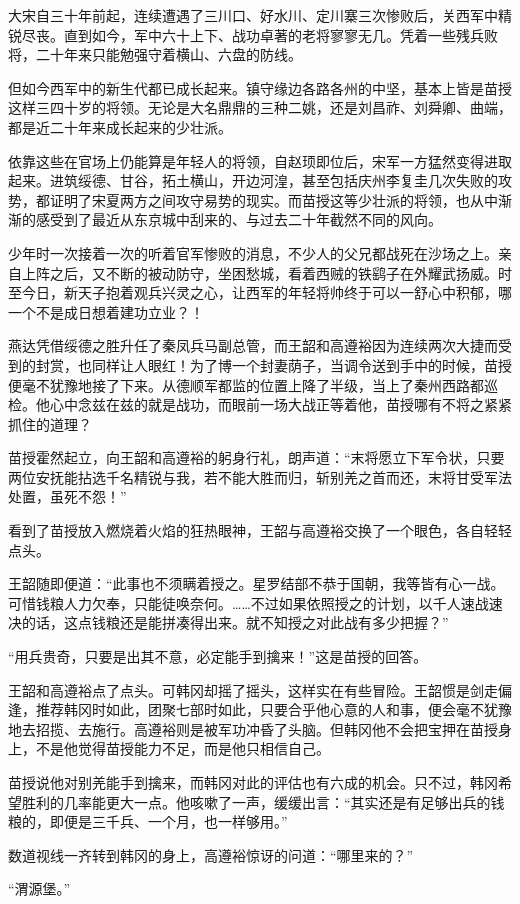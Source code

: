 大宋自三十年前起，连续遭遇了三川口、好水川、定川寨三次惨败后，关西军中精锐尽丧。直到如今，军中六十上下、战功卓著的老将寥寥无几。凭着一些残兵败将，二十年来只能勉强守着横山、六盘的防线。

但如今西军中的新生代都已成长起来。镇守缘边各路各州的中坚，基本上皆是苗授这样三四十岁的将领。无论是大名鼎鼎的三种二姚，还是刘昌祚、刘舜卿、曲端，都是近二十年来成长起来的少壮派。

依靠这些在官场上仍能算是年轻人的将领，自赵顼即位后，宋军一方猛然变得进取起来。进筑绥德、甘谷，拓土横山，开边河湟，甚至包括庆州李复圭几次失败的攻势，都证明了宋夏两方之间攻守易势的现实。而苗授这等少壮派的将领，也从中渐渐的感受到了最近从东京城中刮来的、与过去二十年截然不同的风向。

少年时一次接着一次的听着官军惨败的消息，不少人的父兄都战死在沙场之上。亲自上阵之后，又不断的被动防守，坐困愁城，看着西贼的铁鹞子在外耀武扬威。时至今日，新天子抱着观兵兴灵之心，让西军的年轻将帅终于可以一舒心中积郁，哪一个不是成日想着建功立业？！

燕达凭借绥德之胜升任了秦凤兵马副总管，而王韶和高遵裕因为连续两次大捷而受到的封赏，也同样让人眼红！为了博一个封妻荫子，当调令送到手中的时候，苗授便毫不犹豫地接了下来。从德顺军都监的位置上降了半级，当上了秦州西路都巡检。他心中念兹在兹的就是战功，而眼前一场大战正等着他，苗授哪有不将之紧紧抓住的道理？

苗授霍然起立，向王韶和高遵裕的躬身行礼，朗声道：“末将愿立下军令状，只要两位安抚能拈选千名精锐与我，若不能大胜而归，斩别羌之首而还，末将甘受军法处置，虽死不怨！”

看到了苗授放入燃烧着火焰的狂热眼神，王韶与高遵裕交换了一个眼色，各自轻轻点头。

王韶随即便道：“此事也不须瞒着授之。星罗结部不恭于国朝，我等皆有心一战。可惜钱粮人力欠奉，只能徒唤奈何。……不过如果依照授之的计划，以千人速战速决的话，这点钱粮还是能拼凑得出来。就不知授之对此战有多少把握？”

“用兵贵奇，只要是出其不意，必定能手到擒来！”这是苗授的回答。

王韶和高遵裕点了点头。可韩冈却摇了摇头，这样实在有些冒险。王韶惯是剑走偏逢，推荐韩冈时如此，团聚七部时如此，只要合乎他心意的人和事，便会毫不犹豫地去招揽、去施行。高遵裕则是被军功冲昏了头脑。但韩冈他不会把宝押在苗授身上，不是他觉得苗授能力不足，而是他只相信自己。

苗授说他对别羌能手到擒来，而韩冈对此的评估也有六成的机会。只不过，韩冈希望胜利的几率能更大一点。他咳嗽了一声，缓缓出言：“其实还是有足够出兵的钱粮的，即便是三千兵、一个月，也一样够用。”

数道视线一齐转到韩冈的身上，高遵裕惊讶的问道：“哪里来的？”

“渭源堡。”

